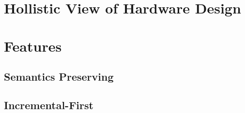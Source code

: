 \documentclass[sigplan,review,nonacm]{acmart}
\begin{document}


\section{Hollistic View of Hardware Design}

\section{Features}
\subsection{Semantics Preserving}

\subsection{Incremental-First}
\end{document}
